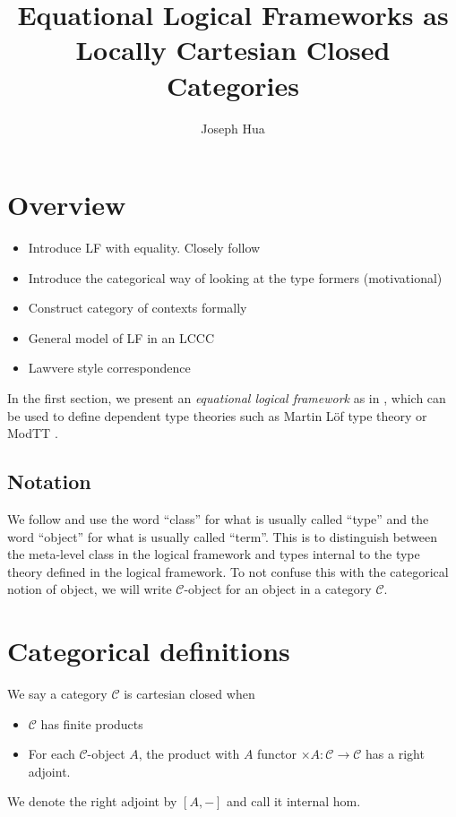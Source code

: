 \documentclass{article}
\newcommand{\<}{\langle}
\renewcommand{\>}{\rangle}
\newcommand{\CC}{\mathcal{C}}
\newcommand{\link}[1]{\hypertarget{#1}{}}
\theoremstyle{definitionstyle}
\theoremstyle{exercisestyle}
\theoremstyle{remarkstyle}
\begin{document}
\title{Equational Logical Frameworks as Locally Cartesian Closed Categories}
\author{Joseph Hua}
\maketitle

\tableofcontents

\section{Overview}

\begin{itemize}
  \item Introduce LF with equality. Closely follow \cite{harper2021equational}
  \item Introduce the categorical way of looking at the type formers (motivational)
  \item Construct category of contexts formally
  \item General model of LF in an LCCC
  \item Lawvere style correspondence
\end{itemize}

In the first section, we present an \textit{equational logical framework} as in \cite{harper2021equational},
which can be used to define dependent type theories such as Martin L{\"o}f type theory or
\textsf{ModTT} \cite{Sterling_2021}.

\subsection{Notation}

We follow \cite{harper2021equational} and use the word ``class'' for what is usually called ``type'' and
the word ``object'' for what is usually called ``term''.
This is to distinguish between the meta-level class in the logical framework
and types internal to the type theory defined in the logical framework.
To not confuse this with the categorical notion of object,
we will write $\CC$-object for an object in a category $\CC$.



\section{Categorical definitions}

\begin{dfn}
  \link{dfn_CCC}
  We say a category $\CC$ is cartesian closed when
  \begin{itemize}
    \item $\CC$ has finite products
    \item For each $\CC$-object $A$, the product with $A$ functor $\times A : \CC \to \CC$ has a right adjoint.
  \end{itemize}
  We denote the right adjoint by $[A,-]$ and call it internal hom.
\end{dfn}
\end{document}
